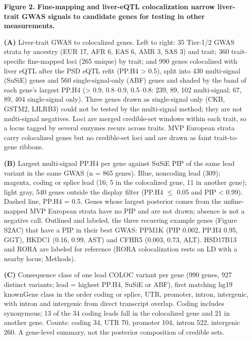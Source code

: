 \textbf{Figure 2. Fine-mapping and liver-eQTL colocalization narrow liver-trait GWAS signals to candidate genes for testing in other measurements.}



\textbf{(A)} Liver-trait GWAS to colocalized genes. Left to right: 35 Tier-1/2 GWAS strata by ancestry (EUR 17, AFR 6, EAS 6, AMR 3, SAS 3) and trait; 360 trait-specific fine-mapped loci (265 unique) by trait; and 990 genes colocalized with liver eQTL after the PSD eQTL refit (PP.H4 \textgreater{} 0.5), split into 430 multi-signal (SuSiE) genes and 560 single-signal-only (ABF) genes and shaded by the band of each gene's largest PP.H4 (\textgreater{} 0.9, 0.8--0.9, 0.5--0.8: 239, 89, 102 multi-signal; 67, 89, 404 single-signal only). Three genes drawn as single-signal only (CKB, GSTM2, LILRB3) could not be tested by the multi-signal method; they are not multi-signal negatives. Loci are merged credible-set windows within each trait, so a locus tagged by several enzymes recurs across traits. MVP European strata carry colocalized genes but no credible-set loci and are drawn as faint trait-to-gene ribbons.

\textbf{(B)} Largest multi-signal PP.H4 per gene against SuSiE PIP of the same lead variant in the same GWAS (n = 865 genes). Blue, noncoding lead (309); magenta, coding or splice lead (16; 5 in the colocalized gene, 11 in another gene); light gray, 540 genes outside the display filter (PP.H4 $\le$ 0.05 and PIP \textless{} 0.99). Dashed line, PP.H4 = 0.5. Genes whose largest posterior comes from the unfine-mapped MVP European strata have no PIP and are not drawn; absence is not a negative call. Outlined and labeled, the three recurring example genes (Figure S2AC) that have a PIP in their best GWAS: PPM1K (PIP 0.002, PP.H4 0.95, GGT), HKDC1 (0.16, 0.99, AST) and CFHR5 (0.003, 0.73, ALT). HSD17B13 and RORA are labeled for reference (RORA colocalization rests on LD with a nearby locus; Methods).

\textbf{(C)} Consequence class of one lead COLOC variant per gene (990 genes, 927 distinct variants; lead = highest PP.H4, SuSiE or ABF), first matching hg19 knownGene class in the order coding or splice, UTR, promoter, intron, intergenic, with intron and intergenic from direct transcript overlap. Coding includes synonymous; 13 of the 34 coding leads fall in the colocalized gene and 21 in another gene. Counts: coding 34, UTR 70, promoter 104, intron 522, intergenic 260. A gene-level summary, not the posterior composition of credible sets.

